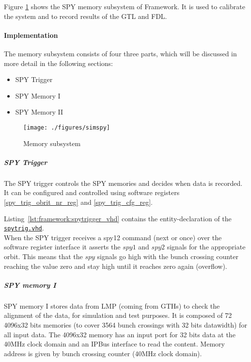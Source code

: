 Figure \ref{fig_simspy} shows the SPY memory subsystem of Framework.
It is used to calibrate the system and to record results of the GTL and FDL.

\paragraph{Implementation}\label{sec:framework:spy_impl}
The memory subsystem consists of four three parts, which will be discussed in more detail in the following sections:

\begin{itemize}
\item SPY Trigger
\item SPY Memory I
\item SPY Memory II
\end{itemize}

\begin{figure}[h]
\texttt{[image: ./figures/simspy]}
\caption{Memory subsystem}
\label{fig_simspy}
\end{figure}

\subparagraph{SPY Trigger}\label{sec:framework:spy_trigger}
The SPY trigger controls the SPY memories and decides when data is recorded. It can be configured and controlled using software registers \ref{spy_trig_obrit_nr_reg} and \ref{spy_trig_cfg_reg}.

Listing~\ref{lst:framework:spytrigger_vhd} contains the entity-declaration of the \href{\gitbranch/firmware/hdl/payload/frame/spytrig.vhd}{\texttt{spytrig.vhd}}.\\



When the SPY trigger receives a spy12 command (next or once) over the software register interface it asserts the $spy1$ and $spy2$ signals for the appropriate orbit.
This means that the $spy$ signals go high with the bunch crossing counter reaching the value zero and stay high until it reaches zero again (overflow).

\subparagraph{SPY memory I}
SPY memory I stores data from LMP (coming from GTHs) to check the alignment of the data, for simulation and test purposes. It is composed of 72 4096x32 bits memories (to cover 3564 bunch crossings with 32 bits datawidth) for all input data. The 4096x32 memory has an input port for 32 bits data at the 40MHz clock domain and an IPBus interface to read the content. Memory address is given by bunch crossing counter (40MHz clock domain).

